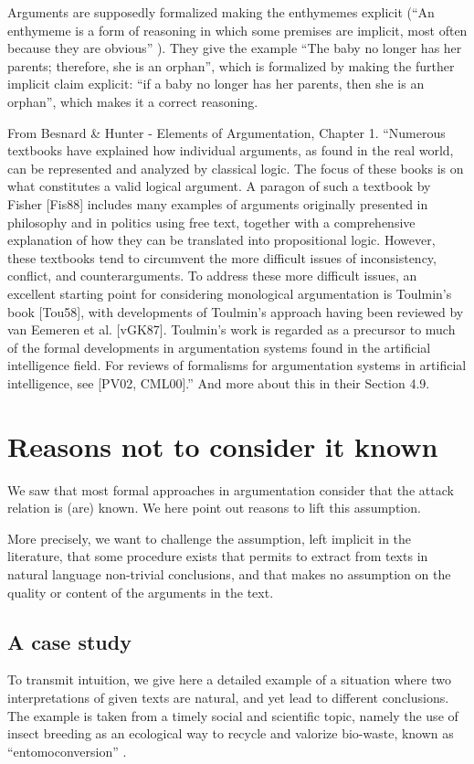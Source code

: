 \documentclass[version=3.21, pagesize, twoside=off, bibliography=totoc, DIV=calc, fontsize=12pt, a4paper, french, english]{scrartcl}
\begin{document}
Arguments are supposedly formalized making the enthymemes explicit (“An enthymeme is a form of reasoning in which some premises are implicit, most often because they are obvious” \citep[p.\ 41]{besnard_elements_2000}). They give the example “The baby no longer has her parents; therefore, she is an orphan”, which is formalized by making the further implicit claim explicit: “if a baby no longer has her parents, then she is an orphan”, which makes it a correct reasoning. 

From Besnard \& Hunter - Elements of Argumentation, Chapter 1. “Numerous textbooks have explained how individual arguments, as found in the real world, can be represented and analyzed by classical logic. The focus of these books is on what constitutes a valid logical argument. A paragon of such a textbook by Fisher [Fis88] includes many examples of arguments originally presented in philosophy and in politics using free text, together with a comprehensive explanation of how they can be translated into propositional logic. However, these textbooks tend to circumvent the more difficult issues of inconsistency, conflict, and counterarguments.
To address these more difficult issues, an excellent starting point for considering monological argumentation is Toulmin’s book [Tou58], with developments of Toulmin’s approach having been reviewed by van Eemeren et al. [vGK87]. Toulmin’s work is regarded as a precursor to much of the formal developments in argumentation systems found in the artificial intelligence field. For reviews of formalisms for argumentation systems in artificial intelligence, see [PV02, CML00].” And more about this in their Section 4.9.

\section{Reasons not to consider it known}
We saw that most formal approaches in argumentation consider that the attack relation is (are) known. 
We here point out reasons to lift this assumption.

More precisely, we want to challenge the assumption, left implicit in the literature, that some procedure exists that permits to extract from texts in natural language non-trivial conclusions, and that makes no assumption on the quality or content of the arguments in the text.

\subsection{A case study}
To transmit intuition, we give here a detailed example of a situation where 
two interpretations of given texts are natural, and yet lead to different 
conclusions. The example is taken from a timely social and scientific topic, namely the use of insect breeding as an ecological way to recycle and valorize bio-waste, known as ``entomoconversion'' \citep{FAO2021,Kialo2019}.
\end{document}
